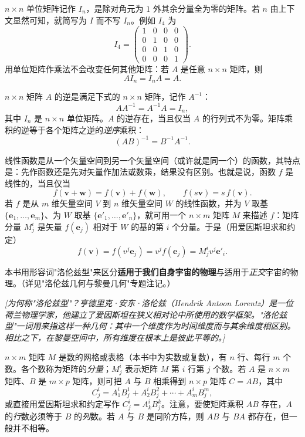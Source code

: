 \begin{description}[style=nextline, leftmargin=0em, itemsep=0.8ex]
\item[单位矩阵（Identity matrix）]
$n\times n$ 单位矩阵记作 $I_n$，是除对角元为 $1$ 外其余分量全为零的矩阵。若 $n$ 由上下文显然可知，就简写为 $I$ 而不写 $I_n$。例如 $I_4$ 为
\[
I_{4}=\begin{pmatrix}1&0&0&0\\0&1&0&0\\0&0&1&0\\0&0&0&1\end{pmatrix}.
\]
用单位矩阵作乘法不会改变任何其他矩阵：若 $A$ 是任意 $n\times n$ 矩阵，则
\[
AI_{n}=I_{n}A=A .
\]

\item[逆矩阵（Inverse matrix）]
$n\times n$ 矩阵 $A$ 的逆是满足下式的 $n\times n$ 矩阵，记作 $A^{-1}$：
\[
AA^{-1}=A^{-1}A=I_{n},
\]
其中 $I_n$ 是 $n\times n$ 单位矩阵。$A$ 的逆存在，当且仅当 $A$ 的行列式不为零。矩阵乘积的逆等于各个矩阵之逆的\emph{逆序}乘积：
\[
(AB)^{-1}=B^{-1}A^{-1}.
\]

\item[线性函数（Linear function）]
线性函数是从一个矢量空间到另一个矢量空间（或许就是同一个）的函数，其特点是：先作函数还是先对矢量作加法或数乘，结果没有区别。也就是说，函数 $f$ 是线性的，当且仅当
\[
f(\mathbf{v}+\mathbf{w})=f(\mathbf{v})+f(\mathbf{w}),\qquad f(s\mathbf{v})=s\,f(\mathbf{v}).
\]
若 $f$ 是从 $m$ 维矢量空间 $V$ 到 $n$ 维矢量空间 $W$ 的线性函数，并为 $V$ 取基 $\{\mathbf{e}_1,\dots,\mathbf{e}_m\}$、为 $W$ 取基 $\{\mathbf{e}'_1,\dots,\mathbf{e}'_n\}$，就可用一个 $n\times m$ 矩阵 $M$ 来描述 $f$：矩阵分量 $M^{i}_{j}$ 是矢量 $f(\mathbf{e}_j)$ 相对于 $W$ 的基的第 $i$ 个分量。于是（用爱因斯坦求和约定）
\[
f(\mathbf{v})=f(v^{j}\mathbf{e}_{j})=v^{j}f(\mathbf{e}_{j})=M^{i}_{j}v^{j}\mathbf{e}'_{i}.
\]

\item[洛伦兹型（Lorentzian）]
本书用形容词"洛伦兹型"来区分\textbf{适用于我们自身宇宙的物理}与适用于\emph{正交}宇宙的物理。（详见"洛伦兹几何与黎曼几何"专题注记。）

\emph{[为何称"洛伦兹型"？亨德里克·安东·洛伦兹（Hendrik Antoon Lorentz）是一位荷兰物理学家，他建立了爱因斯坦在狭义相对论中所使用的数学框架。"洛伦兹型"一词用来指这样一种几何：其中一个维度作为\emph{时间}维度而与其余维度相区别。相比之下，在黎曼空间中，所有维度在根本上是彼此平等的。]}

\item[矩阵（Matrix）]
$n\times m$ 矩阵 $M$ 是数的网格或表格（本书中为实数或复数），有 $n$ 行、每行 $m$ 个数。各个数称为矩阵的\emph{分量}；$M^{i}_{j}$ 表示矩阵 $M$ 第 $i$ 行第 $j$ 个数。若 $A$ 是 $n\times m$ 矩阵、$B$ 是 $m\times p$ 矩阵，则可把 $A$ 与 $B$ 相乘得到 $n\times p$ 矩阵 $C=AB$，其中
\[
C^{i}_{j}=A^{i}_{1}B^{1}_{j}+A^{i}_{2}B^{2}_{j}+\cdots+A^{i}_{m}B^{m}_{j},
\]
或直接用爱因斯坦求和约定写作 $C^{i}_{j}=A^{i}_{k}B^{k}_{j}$。注意，要使矩阵乘积 $AB$ 存在，$A$ 的\emph{行}数必须等于 $B$ 的\emph{列}数。若 $A$ 与 $B$ 是同阶方阵，则 $AB$ 与 $BA$ 都存在，但一般并不相等。


\end{description}
